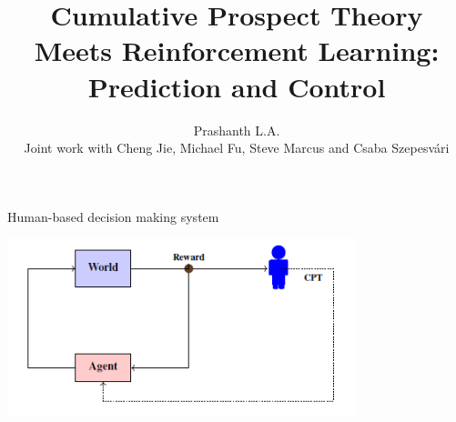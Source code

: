 \documentclass{beamer}
\title{Cumulative Prospect Theory Meets Reinforcement Learning:\\ Prediction and Control}
\date{}
\author{Prashanth L.A.\\[1.5ex]
{\footnotesize Joint work with Cheng Jie, Michael Fu, Steve Marcus and Csaba Szepesv\'ari}}
\institute{University of Maryland, College Park}
\begin{document}
 
\maketitle

\begin{frame}{Human-based decision making system}

\begin{center}
\includegraphics[width=4in]{fig/human_system.png}
\end{center}

\begin{small}
\end{small}

\end{frame}



%
\end{document}
